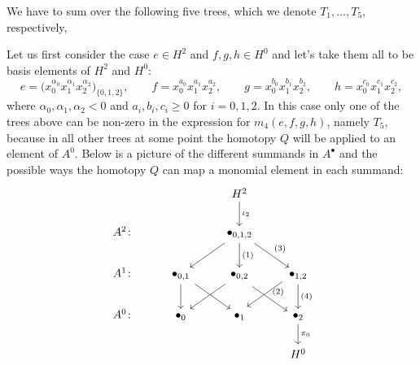\documentclass[pdftex]{sigma}
\numberwithin{equation}{section}
\begin{document}
We have to sum over the following five trees, which we denote $T_1,\dots ,T_5$, respectively,

\begin{center}\quad{}\quad{}\quad{}\quad{}
\end{center}
Let us first consider the case $e\in H^2$ and $f,g,h\in H^0$ and let's take them all to be basis elements of $H^2$ and $H^0$:
\[
e=\big(x_0^{\alpha_0} x_1^{\alpha_1} x_2^{\alpha_2}\big)_{\{0,1,2\}}, \qquad f=x_0^{a_0}x_1^{a_1}x_2^{a_2}, \qquad g=x_0^{b_0}x_1^{b_1}x_2^{b_2}, \qquad h=x_0^{c_0}x_1^{c_1}x_2^{c_2},
\]
where $\alpha_0,\alpha_1,\alpha_2<0$ and $a_i,b_i,c_i\geq 0$ for $i=0,1,2$. In this case only one of the trees above can be non-zero in the expression for $m_4(e,f,g,h)$, namely $T_5$, because in all other trees at some point the homotopy $Q$ will be applied to an element of $A^0$. Below is a picture of the different summands in $A^\bullet$ and the possible ways the homotopy $Q$ can map a monomial element in each summand:
\[\begin{tikzcd}
&&H^2\arrow{d}{\iota_2}&\\
	A^2\colon &&\bullet_{0,1,2}\arrow{dl}{}\arrow{d}{(1)}\arrow{dr}{(3)}&\\
	A^1\colon &\bullet_{0,1}\arrow{d}{}\arrow{dr}{}&\bullet_{0,2}\arrow{dl}{}\arrow[shift right]{dr}{(2)}&\bullet_{1,2}\arrow[shift right]{dl}{}\arrow{d}{(4)}\\
	A^0\colon &\bullet_0&\bullet_1&\bullet_2\arrow{d}{\pi_0}\\
	&&&H^0
\end{tikzcd}
\]
\end{document}
